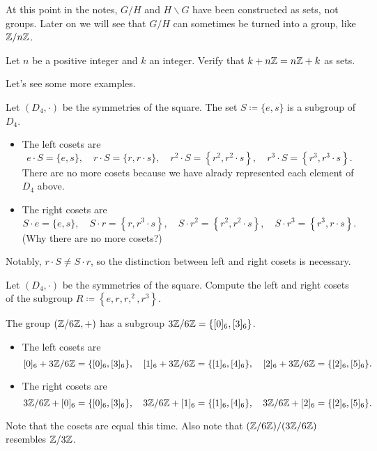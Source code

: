\documentclass[../notes.tex]{subfiles}
\begin{document}
\begin{warn}
    At this point in the notes, $G/H$ and $H\backslash G$ have been constructed as sets, not groups. Later on we will see that $G/H$ can sometimes be turned into a group, like $\mathbb Z/n\mathbb Z$.
\end{warn}
\begin{exe} \label{exe:nz-is-normal}
    Let $n$ be a positive integer and $k$ an integer. Verify that $k+n\mathbb Z=n\mathbb Z+k$ as sets.
\end{exe}
Let's see some more examples.
\begin{example} \label{ex:d4-cosets}
    Let $(D_4,\cdot)$ be the symmetries of the square. The set $S\coloneqq\{e,s\}$ is a subgroup of $D_4$.
    \begin{itemize}
        \item The left cosets are
        \[e\cdot S=\{e,s\},\quad r\cdot S=\{r,r\cdot s\},\quad r^2\cdot S=\left\{r^2,r^2\cdot s\right\},\quad r^3\cdot S=\left\{r^3,r^3\cdot s\right\}.\]
        There are no more cosets because we have alrady represented each element of $D_4$ above.
        \item The right cosets are
        \[S\cdot e=\{e,s\},\quad S\cdot r=\left\{r,r^3\cdot s\right\},\quad S\cdot r^2=\left\{r^2,r^2\cdot s\right\},\quad S\cdot r^3=\left\{r^3,r\cdot s\right\}.\]
        (Why there are no more cosets?)
    \end{itemize}
    Notably, $r\cdot S\ne S\cdot r$, so the distinction between left and right cosets is necessary.
\end{example}
\begin{exe}
    Let $(D_4,\cdot)$ be the symmetries of the square. Compute the left and right cosets of the subgroup $R\coloneqq\left\{e,r,r,^2,r^3\right\}$.
\end{exe}
\begin{example} \label{ex:double-quotient}
    The group $(\mathbb Z/6\mathbb Z,+)$ has a subgroup $3\mathbb Z/6\mathbb Z=\{[0]_6,[3]_6\}$.
    \begin{itemize}
        \item The left cosets are
        \[[0]_6+3\mathbb Z/6\mathbb Z=\{[0]_6,[3]_6\},\quad[1]_6+3\mathbb Z/6\mathbb Z=\{[1]_6,[4]_6\},\quad[2]_6+3\mathbb Z/6\mathbb Z=\{[2]_6,[5]_6\}.\]
        \item The right cosets are
        \[3\mathbb Z/6\mathbb Z+[0]_6=\{[0]_6,[3]_6\},\quad3\mathbb Z/6\mathbb Z+[1]_6=\{[1]_6,[4]_6\},\quad3\mathbb Z/6\mathbb Z+[2]_6=\{[2]_6,[5]_6\}.\]
    \end{itemize}
    Note that the cosets are equal this time. Also note that $(\mathbb Z/6\mathbb Z)/(3\mathbb Z/6\mathbb Z)$ resembles $\mathbb Z/3\mathbb Z$.
\end{example}
\end{document}
